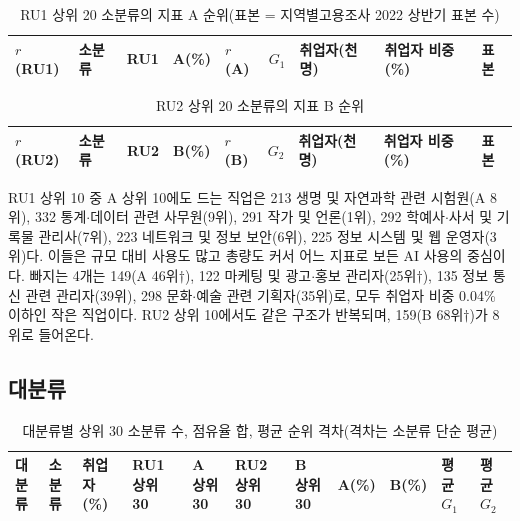 \documentclass[11pt]{article}
\begin{document}
\begin{small}
\begin{longtable}{R{0.6cm}L{4.6cm}R{1.3cm}R{1.0cm}R{0.9cm}R{0.9cm}R{1.4cm}R{1.4cm}R{1.2cm}}
\caption{RU1 상위 20 소분류의 지표 A 순위(표본 = 지역별고용조사 2022 상반기 표본 수)}\label{tab:topuse1}\\
\toprule
$r$(RU1) & 소분류 & RU1 & A(\%) & $r$(A) & $G_1$ & 취업자(천 명) & 취업자 비중(\%) & 표본 \\
\midrule
\endfirsthead

\bottomrule
\end{longtable}

\begin{longtable}{R{0.6cm}L{4.6cm}R{1.3cm}R{1.0cm}R{0.9cm}R{0.9cm}R{1.4cm}R{1.4cm}R{1.2cm}}
\caption{RU2 상위 20 소분류의 지표 B 순위}\label{tab:topuse2}\\
\toprule
$r$(RU2) & 소분류 & RU2 & B(\%) & $r$(B) & $G_2$ & 취업자(천 명) & 취업자 비중(\%) & 표본 \\
\midrule
\endfirsthead

\bottomrule
\end{longtable}
\end{small}

RU1 상위 10 중 A 상위 10에도 드는 직업은 213 생명 및 자연과학 관련 시험원(A 8위), 332 통계$\cdot$데이터 관련 사무원(9위), 291 작가 및 언론(1위), 292 학예사$\cdot$사서 및 기록물 관리사(7위), 223 네트워크 및 정보 보안(6위), 225 정보 시스템 및 웹 운영자(3위)다. 이들은 규모 대비 사용도 많고 총량도 커서 어느 지표로 보든 AI 사용의 중심이다. 빠지는 4개는 149(A 46위$\dagger$), 122 마케팅 및 광고$\cdot$홍보 관리자(25위$\dagger$), 135 정보 통신 관련 관리자(39위), 298 문화$\cdot$예술 관련 기획자(35위)로, 모두 취업자 비중 0.04\% 이하인 작은 직업이다. RU2 상위 10에서도 같은 구조가 반복되며, 159(B 68위$\dagger$)가 8위로 들어온다.

\subsection{대분류}

\begin{longtable}{L{4.2cm}R{0.9cm}R{1.3cm}R{1.2cm}R{1.0cm}R{1.2cm}R{1.0cm}R{1.0cm}R{1.0cm}R{1.2cm}R{1.2cm}}
\caption{대분류별 상위 30 소분류 수, 점유율 합, 평균 순위 격차(격차는 소분류 단순 평균)}\label{tab:ksco1}\\
\toprule
대분류 & 소분류 & 취업자(\%) & RU1 상위 30 & A 상위 30 & RU2 상위 30 & B 상위 30 & A(\%) & B(\%) & 평균 $G_1$ & 평균 $G_2$ \\
\midrule
\endfirsthead

\bottomrule
\end{longtable}
\end{document}
